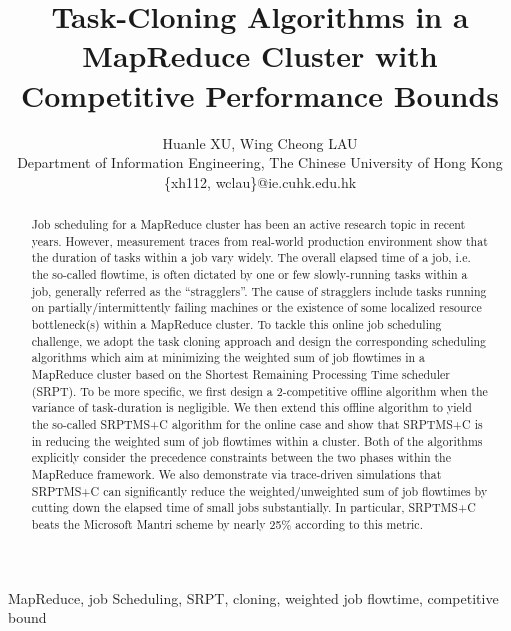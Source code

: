 \documentclass[10pt,conference,compsocconf,letterpaper]{IEEEtran}
\begin{document}
\title{Task-Cloning Algorithms in a MapReduce Cluster with Competitive Performance Bounds}

\author{Huanle XU, Wing Cheong LAU \\ Department of Information Engineering, The Chinese University of Hong Kong\\\{xh112, wclau\}@ie.cuhk.edu.hk \\
}

\maketitle



\begin{abstract}
Job scheduling for a MapReduce cluster has been an active research topic in recent years. However, measurement traces from  real-world production environment show that the duration of tasks within a job vary widely.
The overall elapsed time of a job, i.e. the so-called flowtime,  is often dictated by one or few slowly-running tasks within a job, generally referred as the  ``stragglers''.  The cause of stragglers include tasks running on partially/intermittently failing machines or the existence of some  localized resource bottleneck(s) within a MapReduce cluster.
To tackle this online job scheduling challenge, we adopt the task cloning approach and design the corresponding scheduling algorithms which aim at minimizing the weighted sum of job flowtimes in a MapReduce cluster based on the Shortest Remaining Processing Time scheduler (SRPT). To be more specific, we first design a 2-competitive offline algorithm
when the variance of task-duration is negligible. We then extend  this offline algorithm to yield the so-called  SRPTMS+C algorithm for the online case and show that SRPTMS+C is   in reducing the weighted sum of job flowtimes within a cluster. Both of the algorithms explicitly consider the precedence constraints between the two phases within the MapReduce framework.
We also demonstrate via trace-driven simulations  that SRPTMS+C can significantly reduce the weighted/unweighted sum of job flowtimes by cutting down the elapsed time of small jobs substantially.
In particular, SRPTMS+C beats the Microsoft Mantri scheme by nearly 25\% according to this metric.
\end{abstract}

\begin{keywords}
MapReduce, job Scheduling, SRPT, cloning, weighted job flowtime, competitive bound
\end{keywords}
\end{document}
